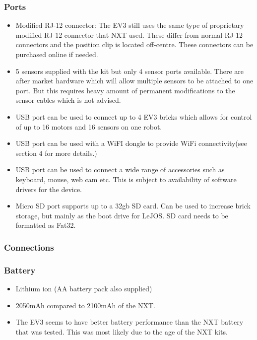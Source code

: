 \documentclass[11pt, a4paper, oneside]{article}
\begin{document}
		\subsubsection{Ports}
		\begin{itemize}
			\item Modified RJ-12 connector: The EV3 still uses the same type of proprietary  modified RJ-12 connector that NXT used. These differ from normal RJ-12 connectors and the position clip is located off-centre. These connectors can be purchased online if needed.
			\item 5 sensors supplied with the kit but only 4 sensor ports available. There are after market hardware which will allow multiple sensors to be attached to one port. But this requires heavy amount of permanent modifications to the sensor cables which is not advised.
			\item USB port can be used to connect up to 4 EV3 bricks which allows for control of up to 16 motors and 16 sensors on one robot.
			\item USB port can be used with a WiFI dongle to provide WiFi connectivity(see section 4 for more details.)
			\item USB port can be used to connect a wide range of accessories such as keyboard, mouse, web cam etc. This is subject to availability of software drivers for the device.
			\item Micro SD port supports up to a 32gb SD card. Can be used to increase brick storage, but mainly as the boot drive for LeJOS. SD card needs to be formatted as Fat32.
		
		\end{itemize}
		
		\subsubsection{Connections}
		
		\subsubsection{Battery}
		\begin{itemize}
		\item Lithium ion (AA battery pack also supplied)
		\item 2050mAh compared to 2100mAh of the NXT.
		\item The EV3 seems to have better battery performance than the NXT battery that was tested. This was most likely due to the age of the NXT kits.
		\end{itemize}
\end{document}
